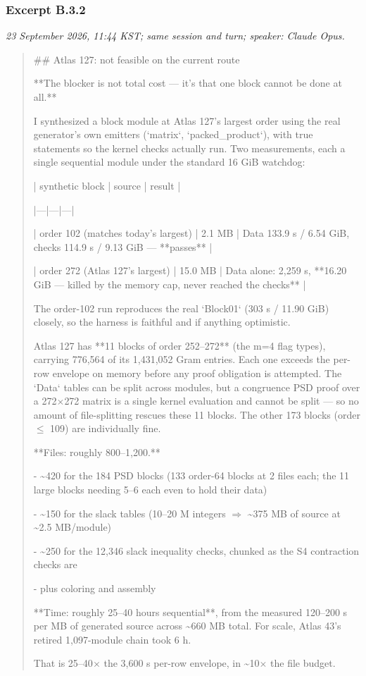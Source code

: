 \subsubsection*{Excerpt B.3.2}
\label{ex:B32}
\noindent\textit{23 September 2026, 11:44 KST; same session and turn; speaker: Claude Opus.}
\begin{quote}\small\ttfamily\raggedright
\#\# Atlas 127: not feasible on the current route
\par
\medskip
**The blocker is not total cost --- it's that one block cannot be done at all.**
\par
\medskip
I synthesized a block module at Atlas 127's largest order using the real generator's own emitters (`matrix`, `packed\_product`), with true statements so the kernel checks actually run. Two measurements, each a single sequential module under the standard 16 GiB watchdog:
\par
\medskip
| synthetic block | source | result |
\par
|---|---|---|
\par
| order 102 (matches today's largest) | 2.1 MB | Data 133.9 s / 6.54 GiB, checks 114.9 s / 9.13 GiB --- **passes** |
\par
| order 272 (Atlas 127's largest) | 15.0 MB | Data alone: 2,259 s, **16.20 GiB --- killed by the memory cap, never reached the checks** |
\par
\medskip
The order-102 run reproduces the real `Block01` (303 s / 11.90 GiB) closely, so the harness is faithful and if anything optimistic.
\par
\medskip
Atlas 127 has **11 blocks of order 252--272** (the m=4 flag types), carrying 776,564 of its 1,431,052 Gram entries. Each one exceeds the per-row envelope on memory before any proof obligation is attempted. The `Data` tables can be split across modules, but a congruence PSD proof over a 272\(\times\)272 matrix is a single kernel evaluation and cannot be split --- so no amount of file-splitting rescues these 11 blocks. The other 173 blocks (order \(\leq\) 109) are individually fine.
\par
\medskip
**Files: roughly 800--1,200.**
\par
- \textasciitilde{}420 for the 184 PSD blocks (133 order-64 blocks at 2 files each; the 11 large blocks needing 5--6 each even to hold their data)
\par
- \textasciitilde{}150 for the slack tables (10--20 M integers \(\Rightarrow\) \textasciitilde{}375 MB of source at \textasciitilde{}2.5 MB/module)
\par
- \textasciitilde{}250 for the 12,346 slack inequality checks, chunked as the S4 contraction checks are
\par
- plus coloring and assembly
\par
\medskip
**Time: roughly 25--40 hours sequential**, from the measured 120--200 s per MB of generated source across \textasciitilde{}660 MB total. For scale, Atlas 43's retired 1,097-module chain took 6 h.
\par
\medskip
That is 25--40\(\times\) the 3,600 s per-row envelope, in \textasciitilde{}10\(\times\) the file budget.
\par
\end{quote}

